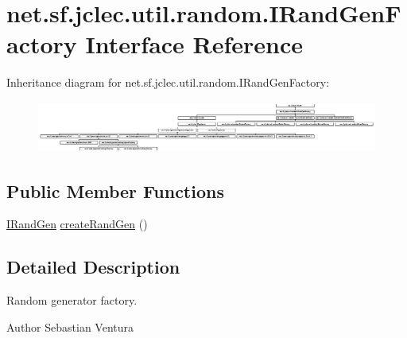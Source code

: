 \hypertarget{interfacenet_1_1sf_1_1jclec_1_1util_1_1random_1_1_i_rand_gen_factory}{\section{net.\-sf.\-jclec.\-util.\-random.\-I\-Rand\-Gen\-Factory Interface Reference}
\label{interfacenet_1_1sf_1_1jclec_1_1util_1_1random_1_1_i_rand_gen_factory}
}
Inheritance diagram for net.\-sf.\-jclec.\-util.\-random.\-I\-Rand\-Gen\-Factory\-:\begin{figure}[H]
\begin{center}
\leavevmode
\includegraphics[height=1.687382cm]{interfacenet_1_1sf_1_1jclec_1_1util_1_1random_1_1_i_rand_gen_factory}
\end{center}
\end{figure}
\subsection*{Public Member Functions}
\begin{DoxyCompactItemize}
\item 
\hyperlink{interfacenet_1_1sf_1_1jclec_1_1util_1_1random_1_1_i_rand_gen}{I\-Rand\-Gen} \hyperlink{interfacenet_1_1sf_1_1jclec_1_1util_1_1random_1_1_i_rand_gen_factory_a03320bb7d2eae4643d02ec66b08db1aa}{create\-Rand\-Gen} ()
\end{DoxyCompactItemize}


\subsection{Detailed Description}
Random generator factory.

\begin{DoxyAuthor}{Author}
Sebastian Ventura 
\end{DoxyAuthor}


